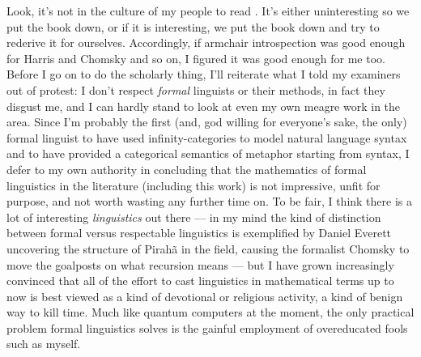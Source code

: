 Look, it's not in the culture of my people to read \cite{}. It's either uninteresting so we put the book down, or if it is interesting, we put the book down and try to rederive it for ourselves. Accordingly, if armchair introspection was good enough for Harris and Chomsky and so on, I figured it was good enough for me too. Before I go on to do the scholarly thing, I'll reiterate what I told my examiners out of protest: I don't respect \emph{formal} linguists or their methods, in fact they disgust me, and I can hardly stand to look at even my own meagre work in the area. Since I'm probably the first (and, god willing for everyone's sake, the only) formal linguist to have used infinity-categories to model natural language syntax and to have provided a categorical semantics of metaphor starting from syntax, I defer to my own authority in concluding that the mathematics of formal linguistics in the literature (including this work) is not impressive, unfit for purpose, and not worth wasting any further time on. To be fair, I think there is a lot of interesting \emph{linguistics} out there --- in my mind the kind of distinction between formal versus respectable linguistics is exemplified by Daniel Everett uncovering the structure of Pirah\~{a} in the field, causing the formalist Chomsky to move the goalposts on what recursion means \cite{} --- but I have grown increasingly convinced that all of the effort to cast linguistics in mathematical terms up to now is best viewed as a kind of devotional or religious activity, a kind of benign way to kill time. Much like quantum computers at the moment, the only practical problem formal linguistics solves is the gainful employment of overeducated fools such as myself.

